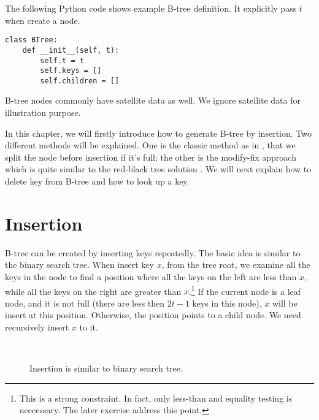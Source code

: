 \documentclass{article}
\begin{document}
The following Python code shows example B-tree definition.
It explicitly pass $t$ when create a node.

\lstset{language=Python}
\begin{lstlisting}
class BTree:
    def __init__(self, t):
        self.t = t
        self.keys = []
        self.children = []
\end{lstlisting}

B-tree nodes commonly have satellite data as well. We ignore
satellite data for illustration purpose.

In this chapter, we will firstly introduce how to generate B-tree by insertion.
Two different methods will be explained. One is the classic method
as in \cite{CLRS}, that we split the node before insertion if it's full;
the other is the modify-fix approach which is quite similar to the
red-black tree solution \cite{okasaki-rbtree} \cite{wiki-b-tree}.
We will next explain how to delete
key from B-tree and how to look up a key.


\section{Insertion}
\label{btree-insertion}

B-tree can be created by inserting
keys repeatedly. The basic idea is similar to the binary
search tree. When insert key $x$, from the tree root, we examine all the
keys in the node to find a position where all the keys on the left are
less than $x$, while all the keys on the right are greater than $x$.\footnote{This is a strong constraint. In fact, only less-than and equality testing is neccessary. The later exercise address this point.}
If the current node is a leaf node, and it is not full (there are
less then $2t-1$ keys in this node), $x$ will be insert at this position.
Otherwise, the position points to a child node.
We need recursively insert $x$ to it.

\begin{figure}[htbp]
  \centering
   \\
  \caption{Insertion is similar to binary search tree.} \label{fig:btree-insert-simple}
\end{figure}
\end{document}

